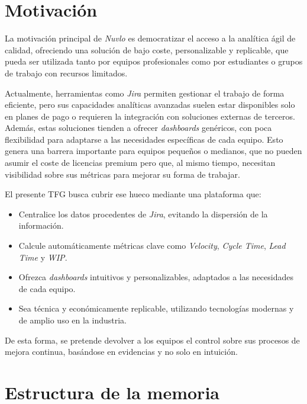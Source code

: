 \section{Motivación}

La motivación principal de \textit{Nuvlo} es democratizar el acceso a la analítica ágil de calidad, ofreciendo una solución de bajo coste, personalizable y replicable, que pueda ser utilizada tanto por equipos profesionales como por estudiantes o grupos de trabajo con recursos limitados.

Actualmente, herramientas como \textit{Jira} permiten gestionar el trabajo de forma eficiente, pero sus capacidades analíticas avanzadas suelen estar disponibles solo en planes de pago o requieren la integración con soluciones externas de terceros. Además, estas soluciones tienden a ofrecer \textit{dashboards} genéricos, con poca flexibilidad para adaptarse a las necesidades específicas de cada equipo. Esto genera una barrera importante para equipos pequeños o medianos, que no pueden asumir el coste de licencias premium pero que, al mismo tiempo, necesitan visibilidad sobre sus métricas para mejorar su forma de trabajar.

El presente TFG busca cubrir ese hueco mediante una plataforma que:
\begin{itemize}
    \item Centralice los datos procedentes de \textit{Jira}, evitando la dispersión de la información.
    \item Calcule automáticamente métricas clave como \textit{Velocity}, \textit{Cycle Time}, \textit{Lead Time} y \textit{WIP}.
    \item Ofrezca \textit{dashboards} intuitivos y personalizables, adaptados a las necesidades de cada equipo.
    \item Sea técnica y económicamente replicable, utilizando tecnologías modernas y de amplio uso en la industria.
\end{itemize}

De esta forma, se pretende devolver a los equipos el control sobre sus procesos de mejora continua, basándose en evidencias y no solo en intuición.


\section{Estructura de la memoria}

